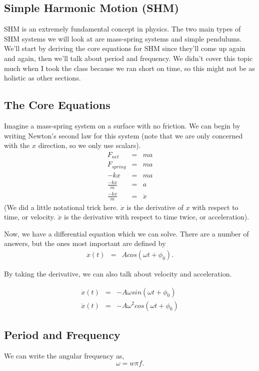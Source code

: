 \subsection{Simple Harmonic Motion (SHM)}
SHM is an extremely fundamental concept in physics. The two main types of SHM systems we will look at are mass-spring systems and simple pendulums. We'll
start by deriving the core equations for SHM since they'll come up again and again, then we'll talk about period and frequency. We didn't cover this
topic much when I took the class because we ran short on time, so this might not be as holistic as other sections.

\subsection{The Core Equations}
Imagine a mass-spring system on a surface with no friction. We can begin by writing Newton's
second law for this system (note that we are only concerned with the $x$ direction, so we only use scalars).
\begin{eqnarray*}
    F_{net} &=& ma \\
    F_{spring} &=& ma \\
    -kx &=& ma \\
    \frac{-kx}{m} &=& a \\
    \frac{-kx}{m} &=& \ddot{x}
\end{eqnarray*}
(We did a little notational trick here. $\dot{x}$ is the derivative of $x$ with respect to time, or velocity. $\ddot{x}$ is the derivative with respect
to time twice, or acceleration).

Now, we have a differential equation which we can solve. There are a number of answers, but the ones most important are defined by
\begin{eqnarray} \label{eq : SHM}
    x(t) &=& Acos(\omega t + \phi_0).
\end{eqnarray}

By taking the derivative, we can also talk about velocity and acceleration.

\begin{eqnarray} \label{eq : SHMav}
    \dot{x}(t) &=& -A \omega sin(\omega t + \phi_0) \\
    \ddot{x}(t) &=& -A \omega^2 cos(\omega t + \phi_0)
\end{eqnarray}

\subsection{Period and Frequency}
We can write the angular frequency as,
\begin{equation}
    \omega = w \pi f.
\end{equation}


